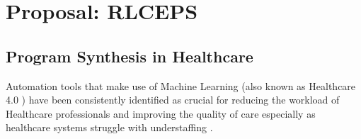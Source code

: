\chapter{Proposal: RLCEPS}
\label{ch:proposal}

\section{Program Synthesis in Healthcare}
\label{sec:ps-health}

Automation tools that make use of Machine Learning (also known as Healthcare 4.0 \cite{tortorellaHealthcare40Trends2020}) have been consistently identified as crucial for reducing the workload of Healthcare professionals and improving the quality of care \cite{agrawalMachineLearningHealthcare2020,deviDesignImplementationAdvanced2022,g.kumarSurveyMachineLearning2016,ganguliMachineLearningPursuit2020,maityMachineLearningImproved2017,mitraMachineLearningHealthcare2021,pianykhImprovingHealthcareOperations2020,xhaferraRoleMachineLearning2022} especially as healthcare systems struggle with understaffing \cite{ashleyy.metcalfHospitalUnitUnderstaffing2016,SurveyShowsHidden1993,UnderstaffingSignificantIssue2012,campbellUniversalHealthCoverage2013,hudsonUnderstaffing2015,mercerMessageEditorinChief2008,r.stanleyUnderstaffedOverwhelmed2010,munnUnderstaffingWardsCompromising2017,thelancetHealthcareSystemStaffing2018}.

